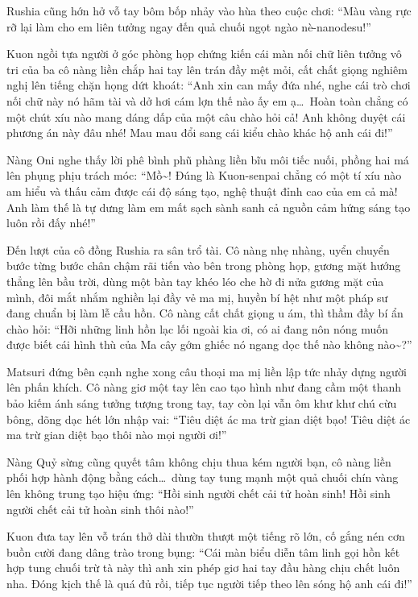\documentclass[../main.tex]{subfiles}
\begin{document}
Rushia cũng hớn hở vỗ tay bôm bốp nhảy vào hùa theo cuộc chơi: ``Màu vàng rực rỡ lại làm cho em liên tưởng ngay đến quả chuối ngọt ngào nè-nanodesu!''


Kuon ngồi tựa người ở góc phòng họp chứng kiến cái màn nối chữ liên tưởng vô tri của ba cô nàng liền chắp hai tay lên trán đầy mệt mỏi, cất chất giọng nghiêm nghị lên tiếng chặn họng dứt khoát: ``Anh xin can mấy đứa nhé, nghe cái trò chơi nối chữ này nó hãm tài và dở hơi cám lợn thế nào ấy em ạ\dots\ Hoàn toàn chẳng có một chút xíu nào mang dáng dấp của một câu chào hỏi cả! Anh không duyệt cái phương án này đâu nhé! Mau mau đổi sang cái kiểu chào khác hộ anh cái đi!''

Nàng Oni nghe thấy lời phê bình phũ phàng liền bĩu môi tiếc nuối, phồng hai má lên phụng phịu trách móc: ``Mồ\~{}! Đúng là Kuon-senpai chẳng có một tí xíu nào am hiểu và thấu cảm được cái độ sáng tạo, nghệ thuật đỉnh cao của em cả mà! Anh làm thế là tự dưng làm em mất sạch sành sanh cả nguồn cảm hứng sáng tạo luôn rồi đấy nhé!''

\ct

Đến lượt của cô đồng Rushia ra sân trổ tài. Cô nàng nhẹ nhàng, uyển chuyển bước từng bước chân chậm rãi tiến vào bên trong phòng họp, gương mặt hướng thẳng lên bầu trời, dùng một bàn tay khéo léo che hờ đi nửa gương mặt của mình, đôi mắt nhắm nghiền lại đầy vẻ ma mị, huyền bí hệt như một pháp sư đang chuẩn bị làm lễ cầu hồn. Cô nàng cất chất giọng u ám, thì thầm đầy bí ẩn chào hỏi: ``Hỡi những linh hồn lạc lối ngoài kia ơi, có ai đang nôn nóng muốn được biết cái hình thù của Ma cây gớm ghiếc nó ngang dọc thế nào không nào\~{}?''

Matsuri đứng bên cạnh nghe xong câu thoại ma mị liền lập tức nhảy dựng người lên phấn khích. Cô nàng giơ một tay lên cao tạo hình như đang cầm một thanh bảo kiếm ánh sáng tưởng tượng trong tay, tay còn lại vẫn ôm khư khư chú cừu bông, dõng dạc hét lớn nhập vai: ``Tiêu diệt ác ma trừ gian diệt bạo! Tiêu diệt ác ma trừ gian diệt bạo thôi nào mọi người ơi!''

Nàng Quỷ sừng cũng quyết tâm không chịu thua kém người bạn, cô nàng liền phối hợp hành động bằng cách\dots\ dùng tay tung mạnh một quả chuối chín vàng lên không trung tạo hiệu ứng: ``Hồi sinh người chết cải tử hoàn sinh! Hồi sinh người chết cải tử hoàn sinh thôi nào!''


Kuon đưa tay lên vỗ trán thở dài thườn thượt một tiếng rõ lớn, cố gắng nén cơn buồn cười đang dâng trào trong bụng: ``Cái màn biểu diễn tâm linh gọi hồn kết hợp tung chuối trừ tà này thì anh xin phép giơ hai tay đầu hàng chịu chết luôn nha. Đóng kịch thế là quá đủ rồi, tiếp tục người tiếp theo lên sóng hộ anh cái đi!''
\end{document}
